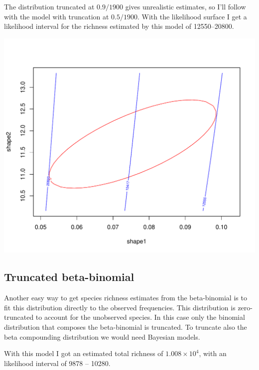 \documentclass[12pt, A4]{article}\usepackage[]{graphicx}\usepackage[]{color}
\makeatletter
\def\maxwidth{ %
  \ifdim\Gin@nat@width>\linewidth
    \linewidth
  \else
    \Gin@nat@width
  \fi
}
\newenvironment{knitrout}{}{} %
\makeatother
\begin{document}
The distribution truncated at $0.9/1900$ gives unrealistic estimates,
so I'll follow with the model with truncation at $0.5/1900$.
With the likelihood surface I get a likelihood interval
for the richness estimated by this model of 12550--20800.

\begin{knitrout}
\color{fgcolor}

{\centering \includegraphics[width=\maxwidth]{figure/beta_likelihood_surface-1} 

}



\end{knitrout}

\subsection*{Truncated beta-binomial}



Another easy way to get species richness estimates
from the beta-binomial is to fit this distribution
directly to the observed frequencies.
This distribution is zero-truncated to account for
the unobserved species. In this case only the
binomial distribution that composes the beta-binomial
is truncated. To truncate also the beta compounding distribution
we would need Bayesian models.

With this model I got an estimated total richness of
\ensuremath{1.008\times 10^{4}}, with an likelihood interval
of 9878 -- 10280.
\end{document}
